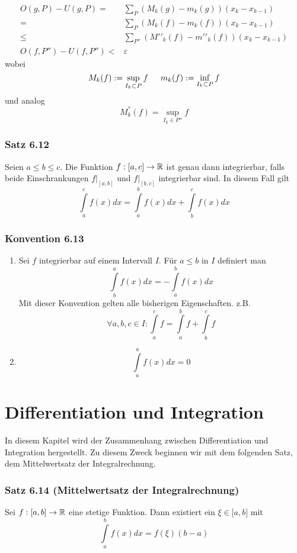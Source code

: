 \begin{align*}
O(g,P) - U(g,P) =&\sum\limits_P {({M_k}(g) - {m_k}(g))({x_k} - {x_{k - 1}})} \\
=&\sum\limits_P {({M_k}(f) - {m_k}(f))({x_k} - {x_{k - 1}})} \\
\le&\sum\limits_{P''} {(M'{'_k}(f) - m'{'_k}(f))({x_k} - {x_{k - 1}})} \\
O(f,P'')-U(f,P'')<& \varepsilon
\end{align*}
wobei
\[{M_k}(f): = \mathop {\sup }\limits_{{I_k} \subset P} f\text{\indent}{m_k}(f): = \mathop {\inf }\limits_{{I_k} \subset P} f\]
und analog
\[M^{''}_{k}\left( f\right) =\sup _{I_k\in P''}f\]

\subsubsection*{Satz 6.12}
Seien $a\leq b\leq c$. Die Funktion $f:\lbrack a,c\rbrack\to\mathbb{R}$ ist genau dann integrierbar, falls beide Einschrankungen ${\left. f \right|_{[a,b]}}$ und ${\left. f \right|_{[b,c]}}$ integrierbar sind. In diesem Fall gilt \[\int\limits_a^c {f(x)dx = \int\limits_a^b {f(x)dx + \int\limits_b^c {f(x)dx} } } \]
\subsubsection*{Konvention 6.13}
\begin{enumerate}[\indent 1)]
\item Sei $f$ integrierbar auf einem Intervall $I$. Für $a\leq b$ in $I$ definiert man \[\int\limits_b^a {f(x)dx =  - \int\limits_a^b {f(x)dx} } \]
Mit dieser Konvention gelten alle bisherigen Eigenschaften. z.B. \[\forall a,b,c \in I:\int\limits_a^c f  = \int\limits_a^b f  + \int\limits_b^c f \]
\item \[\int\limits_a^a {f(x)dx = 0} \]
\end{enumerate}
\section{Differentiation und Integration}
In diesem Kapitel wird der Zusammenhang zwischen Differentiation und Integration hergestellt. Zu diesem Zweck beginnen wir mit dem folgenden Satz, dem Mittelwertsatz der Integralrechnung. \\

\subsubsection*{Satz 6.14 (Mittelwertsatz der Integralrechnung)}
Sei $f:\lbrack a,b\rbrack\to\mathbb{R}$ eine stetige Funktion. Dann existiert ein $\xi\in\lbrack a,b\rbrack$ mit \[\int\limits_a^b {f(x)dx = f(\xi )(b - a)} \]

